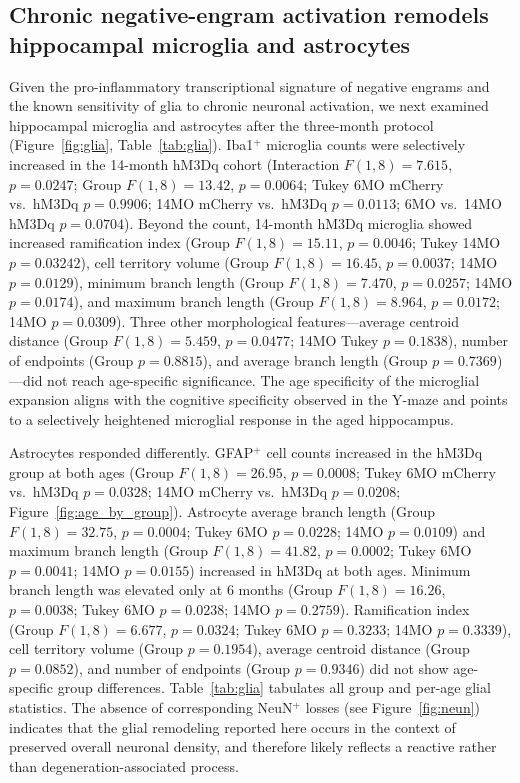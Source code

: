 \documentclass[11pt]{article}
\begin{document}
\subsection{Chronic negative-engram activation remodels hippocampal microglia and astrocytes}

Given the pro-inflammatory transcriptional signature of negative engrams and the known sensitivity of glia to chronic neuronal activation, we next examined hippocampal microglia and astrocytes after the three-month protocol (Figure~\ref{fig:glia}, Table~\ref{tab:glia}). Iba1$^{+}$ microglia counts were selectively increased in the 14-month hM3Dq cohort (Interaction $F(1,8)=7.615$, $p=0.0247$; Group $F(1,8)=13.42$, $p=0.0064$; Tukey 6MO mCherry vs.~hM3Dq $p=0.9906$; 14MO mCherry vs.~hM3Dq $p=0.0113$; 6MO vs.~14MO hM3Dq $p=0.0704$). Beyond the count, 14-month hM3Dq microglia showed increased ramification index (Group $F(1,8)=15.11$, $p=0.0046$; Tukey 14MO $p=0.03242$), cell territory volume (Group $F(1,8)=16.45$, $p=0.0037$; 14MO $p=0.0129$), minimum branch length (Group $F(1,8)=7.470$, $p=0.0257$; 14MO $p=0.0174$), and maximum branch length (Group $F(1,8)=8.964$, $p=0.0172$; 14MO $p=0.0309$). Three other morphological features---average centroid distance (Group $F(1,8)=5.459$, $p=0.0477$; 14MO Tukey $p=0.1838$), number of endpoints (Group $p=0.8815$), and average branch length (Group $p=0.7369$)---did not reach age-specific significance. The age specificity of the microglial expansion aligns with the cognitive specificity observed in the Y-maze and points to a selectively heightened microglial response in the aged hippocampus.

Astrocytes responded differently. GFAP$^{+}$ cell counts increased in the hM3Dq group at both ages (Group $F(1,8)=26.95$, $p=0.0008$; Tukey 6MO mCherry vs.~hM3Dq $p=0.0328$; 14MO mCherry vs.~hM3Dq $p=0.0208$; Figure~\ref{fig:age_by_group}). Astrocyte average branch length (Group $F(1,8)=32.75$, $p=0.0004$; Tukey 6MO $p=0.0228$; 14MO $p=0.0109$) and maximum branch length (Group $F(1,8)=41.82$, $p=0.0002$; Tukey 6MO $p=0.0041$; 14MO $p=0.0155$) increased in hM3Dq at both ages. Minimum branch length was elevated only at 6 months (Group $F(1,8)=16.26$, $p=0.0038$; Tukey 6MO $p=0.0238$; 14MO $p=0.2759$). Ramification index (Group $F(1,8)=6.677$, $p=0.0324$; Tukey 6MO $p=0.3233$; 14MO $p=0.3339$), cell territory volume (Group $p=0.1954$), average centroid distance (Group $p=0.0852$), and number of endpoints (Group $p=0.9346$) did not show age-specific group differences. Table~\ref{tab:glia} tabulates all group and per-age glial statistics. The absence of corresponding NeuN$^{+}$ losses (see Figure~\ref{fig:neun}) indicates that the glial remodeling reported here occurs in the context of preserved overall neuronal density, and therefore likely reflects a reactive rather than degeneration-associated process.
\end{document}
